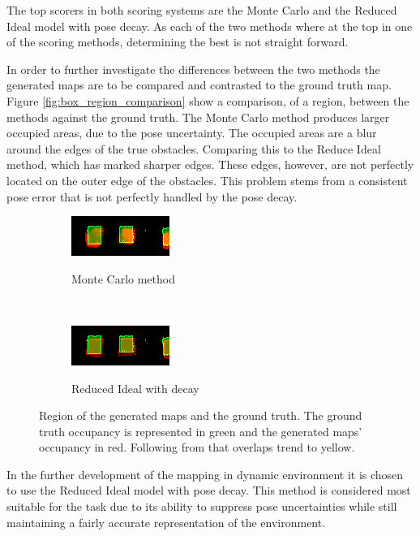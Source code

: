 The top scorers in both scoring systems are the Monte Carlo and the Reduced Ideal model with pose decay. As each of the two methods where at the top in one of the scoring methods, determining the best is not straight forward.

In order to further investigate the differences between the two methods the generated maps are to be compared and contrasted to the ground truth map. 
Figure \vref{fig:box_region_comparison} show a comparison, of a region, between the methods against the ground truth.
The Monte Carlo method produces larger occupied areas, due to the pose uncertainty. The occupied areas are a blur around the edges of the true obstacles. 
Comparing this to the Reduce Ideal method, which has marked sharper edges. 
These edges, however, are not perfectly located on the outer edge of the obstacles. 
This problem stems from a consistent pose error that is not perfectly handled by the pose decay. 

\begin{figure}[htbp]
	\centering
	\begin{subfigure}[t]{0.45\textwidth}
		\includegraphics[scale=1.5]{figures/static_mapping/color_diff_monte_carlo}		
		\label{fig:monte_carlo_mapsec1}
		\caption{Monte Carlo method}
	\end{subfigure}
	~ %
	\begin{subfigure}[t]{0.45\textwidth}
		\includegraphics[scale=1.5]{figures/static_mapping/color_diff_ideal_decay}
		\label{fig:ideal_deacy_mapsec1}
		\caption{Reduced Ideal with decay}
	\end{subfigure}
	\caption{Region of the generated maps and the ground truth. The ground truth occupancy is represented in green and the generated maps' occupancy in red. Following from that overlaps trend to yellow.}
	\label{fig:box_region_comparison}
\end{figure}

In the further development of the mapping in dynamic environment it is chosen to use the Reduced Ideal model with pose decay. This method is considered most suitable for the task due to its ability to suppress pose uncertainties while still maintaining a fairly accurate representation of the environment. 
